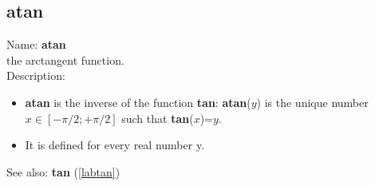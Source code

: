 \subsection{atan}
\label{labatan}
\noindent Name: \textbf{atan}\\
the arctangent function.\\
\noindent Description: \begin{itemize}

\item \textbf{atan} is the inverse of the function \textbf{tan}: \textbf{atan}($y$) is the unique number 
   $x \in [-\pi/2; +\pi/2]$ such that \textbf{tan}($x$)=$y$.

\item It is defined for every real number y.
\end{itemize}
See also: \textbf{tan} (\ref{labtan})
